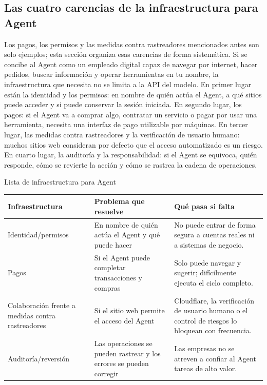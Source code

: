 \documentclass[a4paper]{article}
\begin{document}
\subsection{Las cuatro carencias de la infraestructura para Agent}

Los pagos, los permisos y las medidas contra rastreadores mencionados antes son solo ejemplos; esta sección organiza esas carencias de forma sistemática. Si se concibe al Agent como un empleado digital capaz de navegar por internet, hacer pedidos, buscar información y operar herramientas en tu nombre, la infraestructura que necesita no se limita a la API del modelo. En primer lugar están la identidad y los permisos: en nombre de quién actúa el Agent, a qué sitios puede acceder y si puede conservar la sesión iniciada. En segundo lugar, los pagos: si el Agent va a comprar algo, contratar un servicio o pagar por usar una herramienta, necesita una interfaz de pago utilizable por máquinas. En tercer lugar, las medidas contra rastreadores y la verificación de usuario humano: muchos sitios web consideran por defecto que el acceso automatizado es un riesgo. En cuarto lugar, la auditoría y la responsabilidad: si el Agent se equivoca, quién responde, cómo se revierte la acción y cómo se rastrea la cadena de operaciones.

\begin{knowledgebox}{Lista de infraestructura para Agent}
\begin{tabularx}{\textwidth}{p{}p{}X}
\toprule
Infraestructura & Problema que resuelve & Qué pasa si falta \\
\midrule
Identidad/permisos & En nombre de quién actúa el Agent y qué puede hacer & No puede entrar de forma segura a cuentas reales ni a sistemas de negocio. \\
Pagos & Si el Agent puede completar transacciones y compras & Solo puede navegar y sugerir; difícilmente ejecuta el ciclo completo. \\
Colaboración frente a medidas contra rastreadores & Si el sitio web permite el acceso del Agent & Cloudflare, la verificación de usuario humano o el control de riesgos lo bloquean con frecuencia. \\
Auditoría/reversión & Las operaciones se pueden rastrear y los errores se pueden corregir & Las empresas no se atreven a confiar al Agent tareas de alto valor. \\
\bottomrule
\end{tabularx}
\end{knowledgebox}
\end{document}
